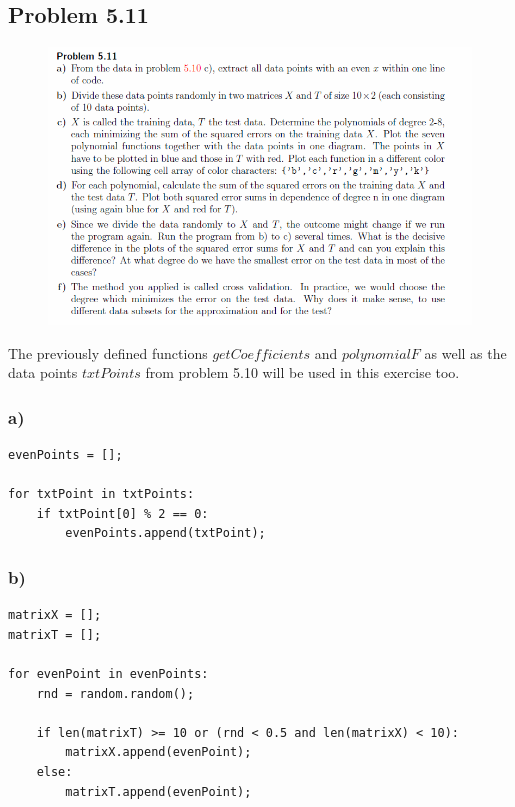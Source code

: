 \subsection{Problem 5.11}


\begin{figure}[!ht]
\includegraphics[width=1\textwidth]{chapters/images/desc-5-11}
\end{figure}

The previously defined functions $getCoefficients$ and $polynomialF$ as well as the data points $txtPoints$ from problem 5.10 will be used in this exercise too.


\subsubsection{a)}

\begin{lstlisting}[caption=Problem 5.11 a)]
evenPoints = [];

for txtPoint in txtPoints:
	if txtPoint[0] % 2 == 0:
		evenPoints.append(txtPoint);
\end{lstlisting}


\subsubsection{b)}

\begin{lstlisting}[caption=Problem 5.11 b)]
matrixX = [];
matrixT = [];

for evenPoint in evenPoints:
	rnd = random.random();
	
	if len(matrixT) >= 10 or (rnd < 0.5 and len(matrixX) < 10):
		matrixX.append(evenPoint);
	else:
		matrixT.append(evenPoint);
\end{lstlisting}


